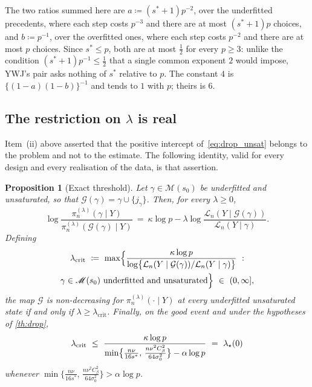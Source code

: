 \documentclass[aos]{imsart}
\newcommand{\gainfloorsm}{%
    \min\bigl\{\tfrac{n\nu}{16s^{\ast}},\,
    \tfrac{n\nu^{2}C_\beta^{2}}{64\sigma_0^{2}}\bigr\}}
\theoremstyle{plain}
\newtheorem{proposition}{Proposition}[section]
\theoremstyle{definition}
\begin{document}
    The two ratios summed here are
    $a\coloneq(s^{\ast}+1)p^{-2}$, over the underfitted precedents, where
    each step costs $p^{-3}$ and there are at most $(s^{\ast}+1)p$ choices,
    and $b\coloneq p^{-1}$, over the overfitted ones, where each step costs
    $p^{-2}$ and there are at most $p$ choices. Since $s^{\ast}\leq p$, both
    are at most $\tfrac12$ for every $p\geq3$: unlike the condition
    $(s^{\ast}+1)p^{-1}\leq\tfrac12$ that a single common exponent $2$ would
    impose, YWJ's pair asks nothing of $s^{\ast}$ relative to $p$. The
    constant $4$ is $\{(1-a)(1-b)\}^{-1}$ and tends to $1$ with $p$; theirs
    is $6$.

    \subsection{The restriction on $\lambda$ is real}

    Item~(ii) above asserted that the positive intercept
    of~\eqref{eq:drop_unsat} belongs to the problem and not to the estimate.
    The following identity, valid for every design and every realisation of
    the data, is that assertion.

    \begin{proposition}[Exact threshold]
        \label{prop:sharp}
        Let $\gamma\in\mathscr{M}(s_0)$ be underfitted and unsaturated, so
        that $\mathcal{G}(\gamma)=\gamma\cup\{j_\gamma\}$. Then, for every
        $\lambda\geq0$,
        \begin{equation}
            \label{eq:sharpid}
            \log\frac{\pi_n^{(\lambda)}(\gamma\mid Y)}
            {\pi_n^{(\lambda)}(\mathcal{G}(\gamma)\mid Y)}
            \ =\ \kappa\log p-\lambda
            \log\frac{\mathcal{L}_n(Y\mid\mathcal{G}(\gamma))}
            {\mathcal{L}_n(Y\mid\gamma)} .
        \end{equation}
        Defining
        \begin{multline}
            \label{eq:lambdacrit}
            \lambda_{\mathrm{crit}}\ \coloneq\
            \max\Bigl\{\frac{\kappa\log p}
            {\log\bigl\{\mathcal{L}_n(Y\mid\mathcal{G}(\gamma))/
            \mathcal{L}_n(Y\mid\gamma)\bigr\}}\ :\\
            \gamma\in\mathscr{M}(s_0)\ \text{underfitted and unsaturated}
            \Bigr\}\ \in\ (0,\infty],
        \end{multline}
        the map $\mathcal{G}$ is non-decreasing for
        $\pi_n^{(\lambda)}(\cdot\mid Y)$ at every underfitted unsaturated
        state if and only if $\lambda\geq\lambda_{\mathrm{crit}}$. Finally, on
        the good event and under the hypotheses of \cref{th:drop},
        \begin{equation}
            \label{eq:lambdacritbound}
            \lambda_{\mathrm{crit}}\ \leq\
            \frac{\kappa\log p}{\gainfloorsm-\alpha\log p}
            \ =\ \lambda_\star(0)
        \end{equation}
        whenever $\gainfloorsm>\alpha\log p$.
    \end{proposition}
\end{document}
